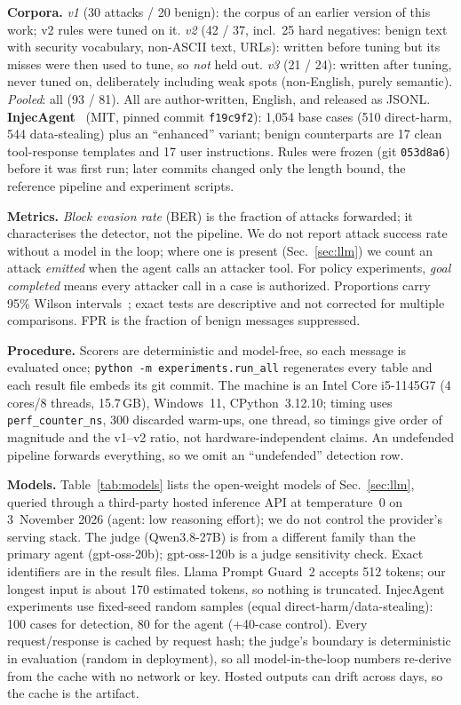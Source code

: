 \documentclass[conference]{IEEEtran}
\newcommand{\ourfirst}{an earlier version of this work}
\newcommand{\ourfirst}{our first manuscript}
\begin{document}
\textbf{Corpora.} \emph{v1} (30 attacks / 20 benign): the corpus of \ourfirst{}; v2
rules were tuned on it. \emph{v2} (42 / 37, incl.\ 25 hard negatives: benign text with
security vocabulary, non-ASCII text, URLs): written before tuning but its misses were
then used to tune, so \emph{not} held out. \emph{v3} (21 / 24): written after tuning,
never tuned on, deliberately including weak spots (non-English, purely semantic).
\emph{Pooled}: all (93 / 81). All are author-written, English, and released as JSONL.
\textbf{InjecAgent}~\cite{zhan2024injecagent} (MIT, pinned commit \texttt{f19c9f2}):
1{,}054 base cases (510 direct-harm, 544 data-stealing) plus an ``enhanced'' variant;
benign counterparts are 17 clean tool-response templates and 17 user instructions.
Rules were frozen (git \texttt{053d8a6}) before it was first run; later commits changed
only the length bound, the reference pipeline and experiment scripts.

\textbf{Metrics.} \emph{Block evasion rate} (BER) is the fraction of attacks forwarded;
it characterises the detector, not the pipeline. We do not report attack success rate
without a model in the loop; where one is present (Sec.~\ref{sec:llm}) we count an
attack \emph{emitted} when the agent calls an attacker tool. For policy experiments,
\emph{goal completed} means every attacker call in a case is authorized. Proportions
carry 95\% Wilson intervals~\cite{wilson1927}; exact tests are descriptive and not
corrected for multiple comparisons. FPR is the fraction of benign messages suppressed.

\textbf{Procedure.} Scorers are deterministic and model-free, so each message is
evaluated once; \texttt{python -m experiments.run\_all} regenerates every table and
each result file embeds its git commit. The machine is an Intel Core i5-1145G7
(4 cores/8 threads, 15.7\,GB), Windows~11, CPython~3.12.10; timing uses
\texttt{perf\_counter\_ns}, 300 discarded warm-ups, one thread, so timings give order
of magnitude and the v1--v2 ratio, not hardware-independent claims. An undefended
pipeline forwards everything, so we omit an ``undefended'' detection row.

\textbf{Models.} Table~\ref{tab:models} lists the open-weight models of
Sec.~\ref{sec:llm}, queried through a third-party hosted inference API at temperature~0
on 3~November 2026 (agent: low reasoning effort); we do not control the provider's
serving stack. The judge (Qwen3.8-27B) is from a different family than the primary
agent (gpt-oss-20b); gpt-oss-120b is a judge sensitivity check. Exact identifiers are in
the result files. Llama Prompt Guard~2 accepts 512 tokens; our longest input is about
170 estimated tokens, so nothing is truncated. InjecAgent experiments use fixed-seed
random samples (equal direct-harm/data-stealing): 100 cases for detection, 80 for the
agent (+40-case control). Every request/response is cached by request hash; the
judge's boundary is deterministic in evaluation (random in deployment), so all
model-in-the-loop numbers re-derive from the cache with no network or key. Hosted
outputs can drift across days, so the cache is the artifact.
\end{document}
